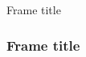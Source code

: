 \documentclass{beamer}
\begin{document}
\begin{frame}{Frame title}
\frametitle{Frame title}
\end{frame}
\end{document}
